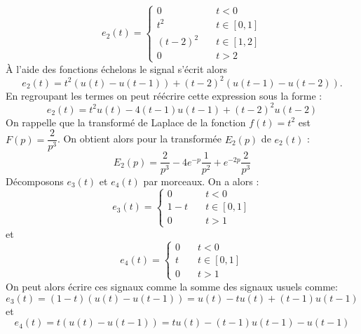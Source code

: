 \[
e_2(t)=
\begin{cases}
    0&\quad t<0\\
    t^2&\quad t\in[0,1]\\
    (t-2)^2&\quad t\in[1,2]\\
    0&\quad t>2
\end{cases}
\]
\`A l'aide des fonctions échelons le signal s'écrit alors 
\[
    e_2(t)=t^2\left(u(t)-u(t-1)\right)+(t-2)^2\left(u(t-1)-u(t-2)\right).
\]
En regroupant les termes on peut réécrire cette expression sous la forme :
\[
    e_2(t)=t^2u(t)-4(t-1)u(t-1)+(t-2)^2u(t-2)
\]
On rappelle que la transformé de Laplace de la fonction $f(t)=t^2$ 
est $F(p)=\dfrac{2}{p^3}$. On obtient alors pour la transformée 
$E_2(p)$ de $e_2(t)$ :
\[
    E_2(p)=\dfrac{2}{p^3}-4e^{-p}\dfrac{1}{p^2}+e^{-2p}\dfrac{2}{p^3}
\]
Décomposons $e_3(t)$ et $e_4(t)$ par morceaux. On a alors :
\[
e_3(t)=
\begin{cases}
    0&\quad t<0\\
    1-t&\quad t\in[0,1]\\
    0&\quad t>1
\end{cases}
\]
et
\[
e_4(t)=
\begin{cases}
    0&\quad t<0\\
    t&\quad t\in[0,1]\\
    0&\quad t>1
\end{cases}
\]
On peut alors écrire ces signaux comme la somme des signaux usuels comme:
\[
    e_3(t)=(1-t)\left(u(t)-u(t-1)\right)=u(t)-tu(t)+(t-1)u(t-1)
\]
et
\[
    e_4(t)=t\left(u(t)-u(t-1)\right)=tu(t) - (t-1)u(t-1) - u(t-1)
\]
